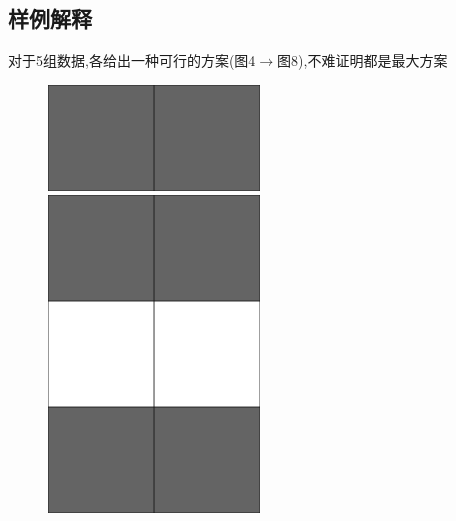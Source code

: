 \documentclass[12pt]{ctexart}
\begin{document}
\subsection{样例解释}
对于5组数据,各给出一种可行的方案(图4$\to$图8),不难证明都是最大方案

\begin{figure}[htbp]
	\centering
	\begin{minipage}[t]{0.32\textwidth}
		\centering
		\includegraphics[width=0.5\textwidth]{pictures/2-1.png}
		\caption{}
	\end{minipage}
	\begin{minipage}[t]{0.32\textwidth}
		\centering
		\includegraphics[width=0.5\textwidth]{pictures/2-2.png}
		\caption{}
	\end{minipage}
	\begin{minipage}[t]{0.32\textwidth}
		\centering

\end{minipage}
\end{figure}
\end{document}
